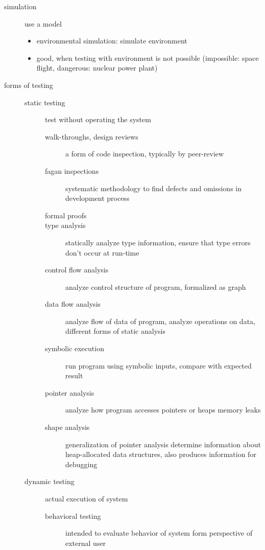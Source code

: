 \documentclass[a4paper, 10pt]{article}
\begin{document}
\begin{description}
    \item[simulation] use a model
    \begin{itemize}
        \item environmental simulation: simulate environment
        \item good, when testing with environment is not possible (impossible: space flight, dangerous: nuclear power plant)
    \end{itemize}
    \item[forms of testing]
    \begin{description}
        \item[static testing] test without operating the system
        \begin{description}
            \item[walk-throughs, design reviews]  a form of code inspection, typically by peer-review
            \item[fagan inspections] systematic methodology to find defects and omissions in development process
            \item[formal proofs]
            \item[type analysis] statically analyze type information, ensure that type errors don't occur at run-time
            \item[control flow analysis] analyze control structure of program, formalized as graph
            \item[data flow analysis] analyze flow of data of program, analyze operations on data, different forms of static analysis
            \item[symbolic execution] run program using symbolic inputs, compare with expected result
            \item[pointer analysis] analyze how program accesses pointers or heaps \follows memory leaks
            \item[shape analysis] generalization of pointer analysis \follows determine information about heap-allocated data structures, also produces information for debugging
        \end{description}
        \item[dynamic testing] actual execution of system
        \begin{description}
            \item[behavioral testing] intended to evaluate behavior of system form perspective of external user
            \begin{description}

\end{description}
\end{description}
\end{description}
\end{description}
\end{document}
